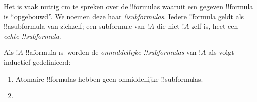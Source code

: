 \documentclass[openany]{memoir}
\begin{document}
\begingroup
\def\olfilename{OLP-0155}
\def\olfilepath{content/first-order-logic/syntax-and-semantics/}
\hypertarget{unit-OLP-0155}{}





\begin{explain}
Het is vaak nuttig om te spreken over de !!{formula}s waaruit een
gegeven !!{formula} is ``opgebouwd''. We noemen deze haar
\emph{!!{subformula}s}. Iedere !!{formula} geldt als !!a{subformula}
van zichzelf; een subformule van $!A$ die niet $!A$ zelf is, heet een
\emph{echte !!{subformula}}.
\end{explain}

\begin{defn}
Als $!A$ !!a{formula} is, worden de \emph{onmiddellijke
!!{subformula}s} van $!A$ als volgt inductief gedefinieerd:
\begin{enumerate}
\item Atomaire !!{formula}s hebben geen onmiddellijke !!{subformula}s.


\item {}


\end{enumerate}
\end{defn}
\end{document}
